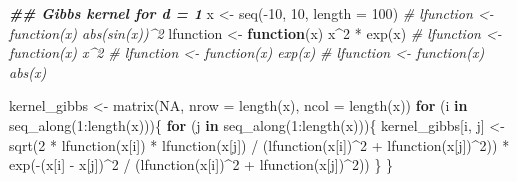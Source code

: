 \documentclass[
]{article}
\newenvironment{Shaded}{\begin{snugshade}}{\end{snugshade}}
\newcommand{\AttributeTok}[1]{\textcolor[rgb]{0.77,0.63,0.00}{#1}}
\newcommand{\CommentTok}[1]{\textcolor[rgb]{0.56,0.35,0.01}{\textit{#1}}}
\newcommand{\ConstantTok}[1]{\textcolor[rgb]{0.00,0.00,0.00}{#1}}
\newcommand{\ControlFlowTok}[1]{\textcolor[rgb]{0.13,0.29,0.53}{\textbf{#1}}}
\newcommand{\DecValTok}[1]{\textcolor[rgb]{0.00,0.00,0.81}{#1}}
\newcommand{\DocumentationTok}[1]{\textcolor[rgb]{0.56,0.35,0.01}{\textbf{\textit{#1}}}}
\newcommand{\FunctionTok}[1]{\textcolor[rgb]{0.00,0.00,0.00}{#1}}
\newcommand{\NormalTok}[1]{#1}
\newcommand{\OtherTok}[1]{\textcolor[rgb]{0.56,0.35,0.01}{#1}}
\newcommand{\SpecialCharTok}[1]{\textcolor[rgb]{0.00,0.00,0.00}{#1}}
\begin{document}
\begin{Shaded}
\begin{Highlighting}[]
\DocumentationTok{\#\# Gibbs kernel for d = 1}
\NormalTok{x }\OtherTok{\textless{}{-}} \FunctionTok{seq}\NormalTok{(}\SpecialCharTok{{-}}\DecValTok{10}\NormalTok{, }\DecValTok{10}\NormalTok{, }\AttributeTok{length =} \DecValTok{100}\NormalTok{)}
\CommentTok{\# lfunction \textless{}{-} function(x) abs(sin(x))\^{}2}
\NormalTok{lfunction }\OtherTok{\textless{}{-}} \ControlFlowTok{function}\NormalTok{(x) x}\SpecialCharTok{\^{}}\DecValTok{2} \SpecialCharTok{*} \FunctionTok{exp}\NormalTok{(x)}
\CommentTok{\# lfunction \textless{}{-} function(x) x\^{}2}
\CommentTok{\# lfunction \textless{}{-} function(x) exp(x)}
\CommentTok{\# lfunction \textless{}{-} function(x) abs(x)}

\NormalTok{kernel\_gibbs }\OtherTok{\textless{}{-}} \FunctionTok{matrix}\NormalTok{(}\ConstantTok{NA}\NormalTok{, }\AttributeTok{nrow =} \FunctionTok{length}\NormalTok{(x), }\AttributeTok{ncol =} \FunctionTok{length}\NormalTok{(x))}
\ControlFlowTok{for}\NormalTok{ (i }\ControlFlowTok{in} \FunctionTok{seq\_along}\NormalTok{(}\DecValTok{1}\SpecialCharTok{:}\FunctionTok{length}\NormalTok{(x)))\{}
  \ControlFlowTok{for}\NormalTok{ (j }\ControlFlowTok{in} \FunctionTok{seq\_along}\NormalTok{(}\DecValTok{1}\SpecialCharTok{:}\FunctionTok{length}\NormalTok{(x)))\{}
\NormalTok{    kernel\_gibbs[i, j] }\OtherTok{\textless{}{-}} \FunctionTok{sqrt}\NormalTok{(}\DecValTok{2} \SpecialCharTok{*} \FunctionTok{lfunction}\NormalTok{(x[i]) }\SpecialCharTok{*} \FunctionTok{lfunction}\NormalTok{(x[j]) }\SpecialCharTok{/}
\NormalTok{                                 (}\FunctionTok{lfunction}\NormalTok{(x[i])}\SpecialCharTok{\^{}}\DecValTok{2} \SpecialCharTok{+} \FunctionTok{lfunction}\NormalTok{(x[j])}\SpecialCharTok{\^{}}\DecValTok{2}\NormalTok{)) }\SpecialCharTok{*}
      \FunctionTok{exp}\NormalTok{(}\SpecialCharTok{{-}}\NormalTok{(x[i] }\SpecialCharTok{{-}}\NormalTok{ x[j])}\SpecialCharTok{\^{}}\DecValTok{2} \SpecialCharTok{/}\NormalTok{ (}\FunctionTok{lfunction}\NormalTok{(x[i])}\SpecialCharTok{\^{}}\DecValTok{2} \SpecialCharTok{+} \FunctionTok{lfunction}\NormalTok{(x[j])}\SpecialCharTok{\^{}}\DecValTok{2}\NormalTok{))}
\NormalTok{  \}}
\NormalTok{\}}


\end{Highlighting}
\end{Shaded}
\end{document}

